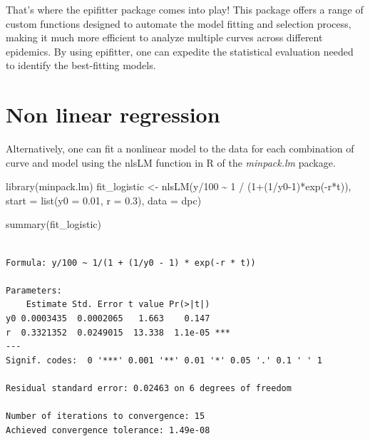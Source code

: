 \documentclass[
  letterpaper,
]{book}
\newenvironment{Shaded}{\begin{snugshade}}{\end{snugshade}}
\newcommand{\AttributeTok}[1]{\textcolor[rgb]{0.40,0.45,0.13}{#1}}
\newcommand{\DecValTok}[1]{\textcolor[rgb]{0.68,0.00,0.00}{#1}}
\newcommand{\FloatTok}[1]{\textcolor[rgb]{0.68,0.00,0.00}{#1}}
\newcommand{\FunctionTok}[1]{\textcolor[rgb]{0.28,0.35,0.67}{#1}}
\newcommand{\NormalTok}[1]{\textcolor[rgb]{0.00,0.23,0.31}{#1}}
\newcommand{\OtherTok}[1]{\textcolor[rgb]{0.00,0.23,0.31}{#1}}
\newcommand{\SpecialCharTok}[1]{\textcolor[rgb]{0.37,0.37,0.37}{#1}}
\begin{document}
That's where the epifitter package comes into play! This package offers
a range of custom functions designed to automate the model fitting and
selection process, making it much more efficient to analyze multiple
curves across different epidemics. By using epifitter, one can expedite
the statistical evaluation needed to identify the best-fitting models.

\hypertarget{non-linear-regression}{%
\section{Non linear regression}\label{non-linear-regression}}

Alternatively, one can fit a nonlinear model to the data for each
combination of curve and model using the nlsLM function in R of the
\emph{minpack.lm} package.

\begin{Shaded}
\begin{Highlighting}[]
\FunctionTok{library}\NormalTok{(minpack.lm)}
\NormalTok{fit\_logistic }\OtherTok{\textless{}{-}} \FunctionTok{nlsLM}\NormalTok{(y}\SpecialCharTok{/}\DecValTok{100} \SpecialCharTok{\textasciitilde{}} \DecValTok{1} \SpecialCharTok{/}\NormalTok{ (}\DecValTok{1}\SpecialCharTok{+}\NormalTok{(}\DecValTok{1}\SpecialCharTok{/}\NormalTok{y0}\DecValTok{{-}1}\NormalTok{)}\SpecialCharTok{*}\FunctionTok{exp}\NormalTok{(}\SpecialCharTok{{-}}\NormalTok{r}\SpecialCharTok{*}\NormalTok{t)), }
           \AttributeTok{start =} \FunctionTok{list}\NormalTok{(}\AttributeTok{y0 =} \FloatTok{0.01}\NormalTok{, }\AttributeTok{r =} \FloatTok{0.3}\NormalTok{), }
           \AttributeTok{data =}\NormalTok{ dpc)}

\FunctionTok{summary}\NormalTok{(fit\_logistic)}
\end{Highlighting}
\end{Shaded}

\begin{verbatim}

Formula: y/100 ~ 1/(1 + (1/y0 - 1) * exp(-r * t))

Parameters:
    Estimate Std. Error t value Pr(>|t|)    
y0 0.0003435  0.0002065   1.663    0.147    
r  0.3321352  0.0249015  13.338  1.1e-05 ***
---
Signif. codes:  0 '***' 0.001 '**' 0.01 '*' 0.05 '.' 0.1 ' ' 1

Residual standard error: 0.02463 on 6 degrees of freedom

Number of iterations to convergence: 15 
Achieved convergence tolerance: 1.49e-08
\end{verbatim}
\end{document}
